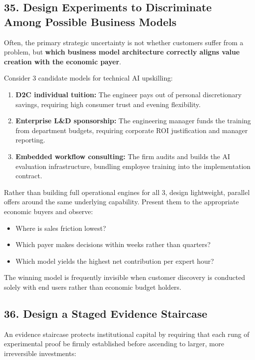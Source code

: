 \subsection*{35. Design Experiments to Discriminate Among Possible Business Models}

Often, the primary strategic uncertainty is not whether customers suffer from a problem, but \textbf{which business model architecture correctly aligns value creation with the economic payer}.

Consider 3 candidate models for technical AI upskilling:
\begin{enumerate}
    \item \textbf{D2C individual tuition:} The engineer pays out of personal discretionary savings, requiring high consumer trust and evening flexibility.
    \item \textbf{Enterprise L\&D sponsorship:} The engineering manager funds the training from department budgets, requiring corporate ROI justification and manager reporting.
    \item \textbf{Embedded workflow consulting:} The firm audits and builds the AI evaluation infrastructure, bundling employee training into the implementation contract.
\end{enumerate}

Rather than building full operational engines for all 3, design lightweight, parallel offers around the same underlying capability. Present them to the appropriate economic buyers and observe:
\begin{itemize}
    \item Where is sales friction lowest?
    \item Which payer makes decisions within weeks rather than quarters?
    \item Which model yields the highest net contribution per expert hour?
\end{itemize}

The winning model is frequently invisible when customer discovery is conducted solely with end users rather than economic budget holders.

\subsection*{36. Design a Staged Evidence Staircase}

An evidence staircase protects institutional capital by requiring that each rung of experimental proof be firmly established before ascending to larger, more irreversible investments:

